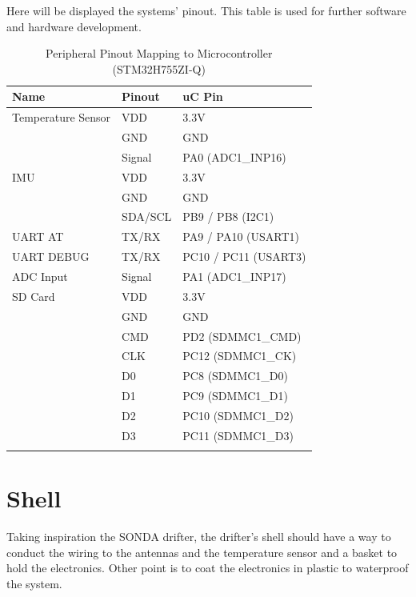 Here will be displayed the systems' pinout. This table is used for further software and hardware development.

\begin{table}[h!]
    \centering
    \small
    \begin{tabular}{l|l|l}
        \textbf{Name} & \textbf{Pinout} & \textbf{uC Pin} \\
        \hline
        \arrayrulecolor[gray]{0.85}
        Temperature Sensor & VDD & 3.3V \\
         & GND & GND \\
         & Signal & PA0 (ADC1\_INP16) \\
        \hline
        IMU & VDD & 3.3V \\
         & GND & GND \\
         & SDA/SCL & PB9 / PB8 (I2C1) \\
        \hline
        UART AT & TX/RX & PA9 / PA10 (USART1) \\
        \hline
        UART DEBUG & TX/RX & PC10 / PC11 (USART3) \\
        \hline
        ADC Input & Signal & PA1 (ADC1\_INP17) \\
        \hline
        SD Card & VDD & 3.3V \\
         & GND & GND \\
         & CMD & PD2 (SDMMC1\_CMD) \\
         & CLK & PC12 (SDMMC1\_CK) \\
         & D0 & PC8 (SDMMC1\_D0) \\
         & D1 & PC9 (SDMMC1\_D1) \\
         & D2 & PC10 (SDMMC1\_D2) \\
         & D3 & PC11 (SDMMC1\_D3) \\
        \arrayrulecolor{black}
    \end{tabular}
    \caption{Peripheral Pinout Mapping to Microcontroller (STM32H755ZI-Q)}
    \label{table:peripheral_pinout}
\end{table}
\section{Shell}

Taking inspiration the SONDA drifter, the drifter's shell should have a way to conduct the wiring to the 
antennas and the temperature sensor and a basket to hold the electronics. Other point is to coat the 
electronics in plastic to waterproof the system.

